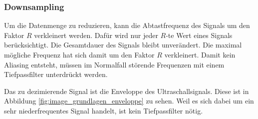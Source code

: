 \subsubsection{Downsampling}\label{sec:downsampling}
Um die Datenmenge zu reduzieren, kann die Abtastfrequenz des Signals um den Faktor $R$ verkleinert werden. Dafür wird nur jeder $R$-te Wert eines Signals berücksichtigt. Die Gesamtdauer des Signals bleibt unverändert.
Die maximal mögliche Frequenz hat sich damit um den Faktor  $R$ verkleinert. Damit kein Aliasing entsteht, müssen im Normalfall störende Frequenzen mit einem Tiefpassfilter unterdrückt werden.

Das zu dezimierende Signal ist die Enveloppe des Ultraschallsignals. Diese ist in Abbildung \ref{fig:image_grundlagen_enveloppe} zu sehen. Weil es sich dabei um ein sehr niederfrequentes Signal handelt, ist kein Tiefpassfilter nötig.
